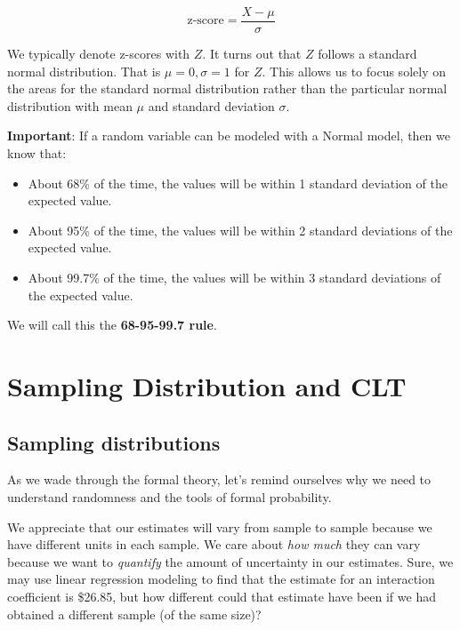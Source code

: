 \documentclass[
]{book}
\providecommand{\tightlist}{%
  \setlength{\itemsep}{0pt}\setlength{\parskip}{0pt}}
\begin{document}
\[\text{z-score} = \frac{X - \mu}{\sigma}\]

We typically denote z-scores with \(Z\). It turns out that \(Z\) follows a standard normal distribution. That is \(\mu=0, \sigma=1\) for \(Z\). This allows us to focus solely on the areas for the standard normal distribution rather than the particular normal distribution with mean \(\mu\) and standard deviation \(\sigma\).

\textbf{Important}: If a random variable can be modeled with a Normal model, then we know that:

\begin{itemize}
\tightlist
\item
  About 68\% of the time, the values will be within 1 standard deviation of the expected value.
\item
  About 95\% of the time, the values will be within 2 standard deviations of the expected value.
\item
  About 99.7\% of the time, the values will be within 3 standard deviations of the expected value.
\end{itemize}

We will call this the \textbf{68-95-99.7 rule}.

\hypertarget{sampling-distribution-and-clt}{%
\section{Sampling Distribution and CLT}\label{sampling-distribution-and-clt}}

\hypertarget{sampling-distributions}{%
\subsection{Sampling distributions}\label{sampling-distributions}}

As we wade through the formal theory, let's remind ourselves why we need to understand randomness and the tools of formal probability.

We appreciate that our estimates will vary from sample to sample because we have different units in each sample. We care about \emph{how much} they can vary because we want to \emph{quantify} the amount of uncertainty in our estimates. Sure, we may use linear regression modeling to find that the estimate for an interaction coefficient is \$26.85, but how different could that estimate have been if we had obtained a different sample (of the same size)?
\end{document}
